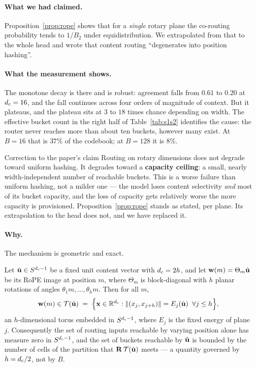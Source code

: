 \paragraph{What we had claimed.} Proposition~\ref{prop:rope} shows that for a \emph{single} rotary plane the co-routing probability tends to $1/B_2$ under equidistribution. We extrapolated from that to the whole head and wrote that content routing ``degenerates into position hashing''.

\paragraph{What the measurement shows.} The monotone decay is there and is robust: agreement falls from $0.61$ to $0.20$ at $d_{\mathrm{c}}=16$, and the fall continues across four orders of magnitude of context. But it plateaus, and the plateau sits at $3$ to $18$ times chance depending on width. The effective bucket count in the right half of Table~\ref{tab:s1s2} identifies the cause: the router never reaches more than about ten buckets, however many exist. At $B=16$ that is $37\%$ of the codebook; at $B=128$ it is $8\%$.

\begin{revision}{Correction to the paper's claim}
Routing on rotary dimensions does not degrade toward uniform hashing. It degrades toward a \textbf{capacity ceiling}: a small, nearly width-independent number of reachable buckets. This is a worse failure than uniform hashing, not a milder one --- the model loses content selectivity \emph{and} most of its bucket capacity, and the loss of capacity gets relatively worse the more capacity is provisioned. Proposition~\ref{prop:rope} stands as stated, per plane. Its extrapolation to the head does not, and we have replaced it.
\end{revision}

\paragraph{Why.} The mechanism is geometric and exact.

\begin{proposition}
\label{prop:torus}
Let $\hat{\mathbf{u}} \in S^{d_{\mathrm{c}} - 1}$ be a fixed unit content vector with $d_{\mathrm{c}} = 2h$, and let $\mathbf{w}(m) = \Theta_m \hat{\mathbf{u}}$ be its RoPE image at position $m$, where $\Theta_m$ is block-diagonal with $h$ planar rotations of angles $\theta_1 m, \dots, \theta_h m$. Then for all $m$,
\begin{equation}
  \mathbf{w}(m) \in \mathcal{T}(\hat{\mathbf{u}}) \;=\; \Big\{ \mathbf{x} \in \mathbb{R}^{d_{\mathrm{c}}} : \|(x_j, x_{j+h})\| = E_j(\hat{\mathbf{u}}) \;\; \forall j \le h \Big\},
\end{equation}
an $h$-dimensional torus embedded in $S^{d_{\mathrm{c}}-1}$, where $E_j$ is the fixed energy of plane $j$. Consequently the set of routing inputs reachable by varying position alone has measure zero in $S^{d_{\mathrm{c}}-1}$, and the set of buckets reachable by $\hat{\mathbf{u}}$ is bounded by the number of cells of the partition that $\mathbf{R}\,\mathcal{T}(\hat{\mathbf{u}})$ meets --- a quantity governed by $h = d_{\mathrm{c}}/2$, not by $B$.
\end{proposition}

